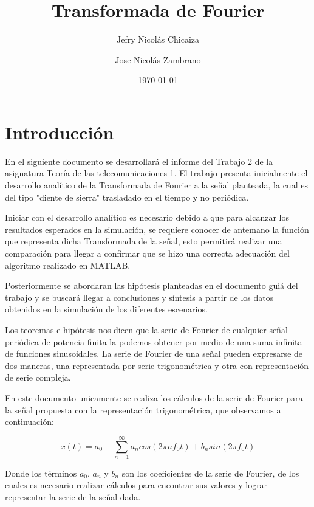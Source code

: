 \documentclass[11pt,a4paper,twocolumn]{article}
\date{\today}
\title{
    \fontsize{26}{26}\selectfont 
    \textbf{Transformada de Fourier}}
\author[1]{Jefry Nicolás Chicaiza}
\author[2]{Jose Nicolás Zambrano}
\affil[1]{jefryn@unicauca.edu.co}
\affil[2]{jnzambranob@unicauca.edu.co}
\date{}
\begin{document}
\maketitle
\thispagestyle{fancy}
\section{Introducción}
    En el siguiente documento se desarrollará el informe del Trabajo 2 de la asignatura 
    Teoría de las telecomunicaciones 1. El trabajo presenta inicialmente el desarrollo 
    analítico de la Transformada de Fourier a la señal planteada, la cual es del tipo 
    "diente de sierra"  trasladado en el tiempo y no periódica.
    
    Iniciar con el desarrollo analítico es necesario debido a que para alcanzar los 
    resultados esperados en la simulación, se requiere conocer de antemano la función que 
    representa dicha Transformada de la señal, esto permitirá realizar una comparación
    para llegar a confirmar que se hizo una correcta adecuación del algoritmo realizado en MATLAB.
    
    
    

    Posteriormente se abordaran las hipótesis planteadas en el documento guiá del trabajo 
    y se buscará llegar a conclusiones y síntesis a partir de los datos obtenidos en la 
    simulación de los diferentes escenarios.
    
    Los teoremas e hipótesis nos dicen que la serie de Fourier de cualquier señal periódica de potencia 
    finita la podemos obtener por medio de una suma infinita de funciones sinusoidales. La serie de 
    Fourier de una señal pueden expresarse de dos maneras, una representada por serie trigonométrica y 
    otra con representación de serie compleja. 
    
    En este documento unicamente se realiza los cálculos de la serie de Fourier para la señal propuesta 
    con la representación trigonométrica, que observamos a continuación:

    \begin{equation}
        x(t)=a_{0}+\sum_{n=1}^{\infty} a_{n}cos(2\pi nf_{0}t)+b_{n}sin(2\pi f_{0}t)
        \label{equation1}
    \end{equation}
    
    Donde los términos $a_{0}$, $a_{n}$ y $b_{n}$ son los coeficientes de la serie de Fourier, de los cuales
    es necesario realizar cálculos para encontrar sus valores y lograr representar la serie de la señal dada.
   
\end{document}
